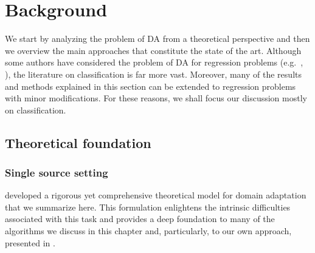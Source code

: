 \section{Background}
\label{sec:chp3_background}
We start by analyzing the problem of DA from a theoretical perspective and then we overview the main approaches that constitute the state of the art. Although some authors have considered the problem of DA for regression problems (e.g.\ \citet{Cortes2011}, \citet{Zhao2018}), the literature on classification is far more vast. Moreover, many of the results and methods explained in this section can be extended to regression problems with minor modifications. For these reasons, we shall focus our discussion mostly on classification.

\subsection{Theoretical foundation}
\label{sec:da_theory}

\subsubsection{Single source setting}
\label{sec:da_theory_ss}
\citet{BenDavid2010} developed a rigorous yet comprehensive theoretical model for domain adaptation that we summarize here. This formulation enlightens the intrinsic difficulties associated with this task and provides a deep foundation to many of the algorithms we discuss in this chapter and, particularly, to our own approach, presented in .

